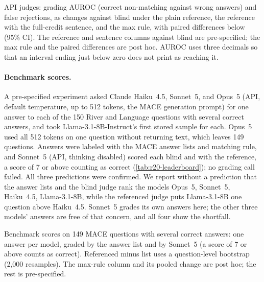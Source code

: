 \begin{table}[htbp]
\centering
\caption{API judges: grading AUROC (correct non-matching against wrong answers) and false rejections, as changes against blind under the plain reference, the reference with the full-credit sentence, and the max rule, with paired differences below (95\% CI). The reference and sentence columns against blind are pre-specified; the max rule and the paired differences are post hoc. AUROC uses three decimals so that an interval ending just below zero does not print as reaching it.}
\label{tab:r20-safeguards}
\footnotesize
\begin{adjustbox}{max width=\linewidth}\end{adjustbox}
\end{table}

\paragraph{Benchmark scores.}
A pre-specified experiment asked Claude Haiku~4.5, Sonnet~5, and Opus~5 (API, default temperature, up to 512 tokens, the \textsc{MACE} generation prompt) for one answer to each of the 150 River and Language questions with several correct answers, and took Llama-3.1-8B-Instruct's first stored sample for each. Opus~5 used all 512 tokens on one question without returning text, which leaves 149 questions. Answers were labeled with the \textsc{MACE} answer lists and matching rule, and Sonnet~5 (API, thinking disabled) scored each blind and with the reference, a score of 7 or above counting as correct (\cref{tab:r20-leaderboard}); no grading call failed. All three predictions were confirmed. We report without a prediction that the answer lists and the blind judge rank the models Opus~5, Sonnet~5, Haiku~4.5, Llama-3.1-8B, while the referenced judge puts Llama-3.1-8B one question above Haiku~4.5. Sonnet~5 grades its own answers here; the other three models' answers are free of that concern, and all four show the shortfall.

\begin{table}[htbp]
\centering
\caption{Benchmark scores on 149 \textsc{MACE} questions with several correct answers: one answer per model, graded by the answer list and by Sonnet~5 (a score of 7 or above counts as correct). Referenced minus list uses a question-level bootstrap (2,000 resamples). The max-rule column and its pooled change are post hoc; the rest is pre-specified.}
\label{tab:r20-leaderboard}
\footnotesize
\begin{adjustbox}{max width=\linewidth}\end{adjustbox}
\end{table}

